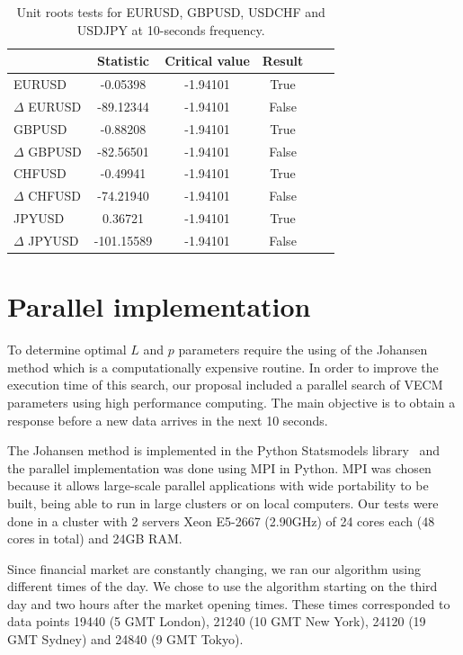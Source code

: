 \begin{table}[h!]
\begin{center}
\begin{tabular}{|l|c|c|c|c|c|}
\hline
& \textbf{Statistic} & \textbf{Critical value} & \textbf{Result}\\
\hline
EURUSD          &  -0.05398   & -1.94101 & True       \\
$\Delta$ EURUSD & -89.12344   & -1.94101 & False       \\
GBPUSD          &  -0.88208   & -1.94101 & True          \\
$\Delta$ GBPUSD & -82.56501   & -1.94101 & False       \\
CHFUSD          & -0.49941    & -1.94101 & True         \\
$\Delta$ CHFUSD & -74.21940   & -1.94101 & False       \\
JPYUSD          &  0.36721    & -1.94101 & True        \\
$\Delta$ JPYUSD & -101.15589  & -1.94101 & False     \\ 
\hline
\end{tabular}
\end{center}
\caption{Unit roots tests for EURUSD, GBPUSD, USDCHF and USDJPY at 10-seconds
frequency.}
\label{tab:adf}
\end{table}


\section{Parallel implementation} \label{sec:paralell}

To determine optimal $L$ and $p$ parameters require the using of the Johansen
method which is a computationally expensive routine. 
In order to improve the execution time of this search, our proposal included
a parallel search of VECM parameters using high performance computing.
The main objective is to obtain a response before a new data arrives in
the next 10 seconds.

The Johansen method is implemented in the Python Statsmodels
library~\cite{seabold2010} and the parallel implementation was done using
MPI in Python. 
MPI was chosen because it allows large-scale parallel applications
with wide portability to be built, being able to run in large clusters
or on local computers.
Our tests were done in a cluster with 2 servers Xeon E5-2667 (2.90GHz)
of 24 cores each (48 cores in total) and 24GB RAM.

Since financial market are constantly changing, we ran our
algorithm using different times of the day. We chose to use the algorithm
starting on the third day and two hours after the market opening times. These
times corresponded to data points 19440 (5 GMT London), 21240 (10 GMT New
York), 24120 (19 GMT Sydney) and 24840 (9 GMT Tokyo).

